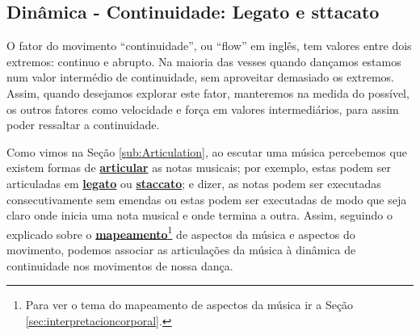 \subsection{Dinâmica - Continuidade: Legato e sttacato }


O fator do movimento ``continuidade'', 
ou ``flow'' em inglês, tem valores entre dois extremos: continuo e  abrupto.
Na maioria das vesses quando dançamos estamos num valor intermédio de continuidade,
sem aproveitar demasiado os extremos.
Assim, quando desejamos explorar este fator, manteremos na medida do possível,
os outros fatores como velocidade e força em valores intermediários,
para assim poder ressaltar a continuidade.

Como vimos na Seção \ref{sub:Articulation}, 
ao escutar uma música percebemos que existem formas de \hyperref[sub:Articulation]{\textbf{articular}} as notas musicais;
por exemplo, estas podem ser articuladas em 
\hyperref[subsec:Legato]{\textbf{legato}} ou \hyperref[subsec:Staccato]{\textbf{staccato}};
e dizer, as notas podem ser executadas consecutivamente sem emendas ou 
estas podem ser executadas de modo que seja claro onde inicia uma nota musical e onde termina a outra.
Assim, 
seguindo o explicado sobre o \hyperref[sec:interpretacioncorporal]{\textbf{mapeamento}}\footnote{Para
ver o tema do mapeamento de aspectos da música ir a Seção \ref{sec:interpretacioncorporal}.} 
de aspectos da música e aspectos do movimento,
podemos associar as articulações da música à dinâmica de continuidade nos movimentos de nossa dança.\\



